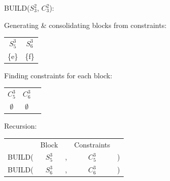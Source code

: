 \documentclass[11pt]{article} %
\begin{document}
	\hspace{0.5cm}BUILD($S_3^2$, $C_3^2$):
		\begin{center}
		Generating \& consolidating blocks from constraints:
		
		\begin{tabular}{c c}
			\hspace{0.8cm}$S_5^3$\hspace{0.8cm} & \hspace{0.8cm}$S_6^3$\hspace{0.8cm} \\
			\{e\} & \{f\}
		\end{tabular}
	
		Finding constraints for each block:
		
		\begin{tabular}{c c c}
			\hspace{0.8cm}$C_5^3$\hspace{0.8cm} & \hspace{0.8cm}$C_6^3$\hspace{0.8cm} \\
			$\emptyset$ & $\emptyset$
		\end{tabular}

		Recursion:
		
		\begin{tabular}{c c c c c}
			 & Block & & Constraints & \\
			BUILD( & $S_5^3$ & , & $C_5^3$ & ) \\
			BUILD( & $S_6^3$ & , & $C_6^3$ & )
		\end{tabular}
		\end{center}
\end{document}
